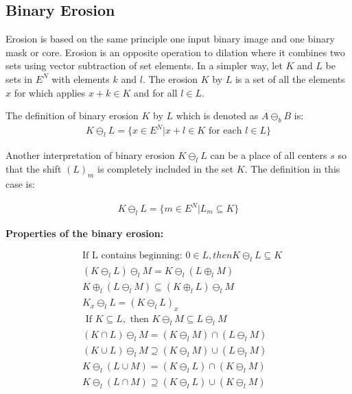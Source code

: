 \subsection{Binary Erosion}
Erosion is based on the same principle one input binary image and one binary mask or core. Erosion is an opposite operation to dilation where it combines two sets using vector subtraction of set elements. In a simpler way, let $K$ and $L$ be sets in $E^N$ with elements $k$ and $l$. The erosion $K$ by $L$ is a set of all the elements $x$ for which applies $x + k \in K$ and for all $l \in L$. \cite{shih2009image} \cite{morph_new}


The definition of binary erosion $K$ by $L$ which is denoted as $A \ominus_b B$ is: \cite{dil2}
\begin{align} 
	K \ominus_l L = \{ x \in E^N | x+l \in K \textrm{ for each } l \in L \}
\end{align}

Another interpretation of binary erosion $K \ominus_l L$ can be a place of all centers $s$ so that the shift $(L)_m$ is completely included in the set $K$. The definition in this case is: \cite{dil2} \cite{morph_new}

\begin{align} 
K \ominus_l L = \{ m \in E^N | L_m \subseteq K \}
\end{align}

\textbf{Properties of the binary erosion:} \cite{shih2009image}

\begin{align}
    &\text{If L contains beginning: }0 \in L, then K \ominus_l L \subseteq K\\
    &\left(K \ominus_{l} L\right) \ominus_{l} M=K \ominus_{l}\left(L \oplus_{l} M\right)\\
    &K \oplus_{l}\left(L \ominus_{l} M\right) \subseteq\left(K \oplus_{l} L\right) \ominus_{l} M\\
    &K_{x} \ominus_{l} L=\left(K \ominus_{l} L\right)_{x}\\
    &\text { If } K \subseteq L, \text { then } K \ominus_{l} M \subseteq L \ominus_{l} M\\
    &(K \cap L) \ominus_{l} M=\left(K \ominus_{l} M\right) \cap\left(L \ominus_{l} M\right)\\
    &(K \cup L) \ominus_{l} M \supseteq\left(K \ominus_{l} M\right) \cup\left(L \ominus_{l} M\right)\\
    &K \ominus_{l}(L \cup M)=\left(K \ominus_{l} L\right) \cap\left(K \ominus_{l} M\right)\\
    &K \ominus_{l}(L \cap M) \supseteq\left(K \ominus_{l} L\right) \cup\left(K \ominus_{l} M\right)
\end{align}

